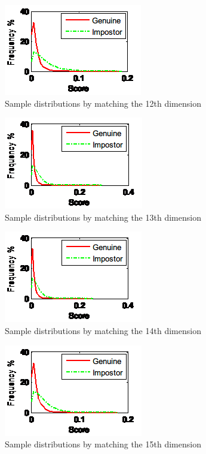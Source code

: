 \begin{figure}[htb]
  \begin{center}
    \includegraphics[scale=1]{ch-experiment/figures/11l}
    \caption{Sample distributions by matching the 12th dimension}
    \label{fig:experiment:11l}
  \end{center}
\end{figure}

\begin{figure}[htb]
  \begin{center}
    \includegraphics[scale=1]{ch-experiment/figures/11m}
    \caption{Sample distributions by matching the 13th dimension}
    \label{fig:experiment:11m}
  \end{center}
\end{figure}

\begin{figure}[htb]
  \begin{center}
    \includegraphics[scale=1]{ch-experiment/figures/11n}
    \caption{Sample distributions by matching the 14th dimension}
    \label{fig:experiment:11n}
  \end{center}
\end{figure}

\begin{figure}[htb]
  \begin{center}
    \includegraphics[scale=1]{ch-experiment/figures/11o}
    \caption{Sample distributions by matching the 15th dimension}
    \label{fig:experiment:11o}
  \end{center}
\end{figure}

